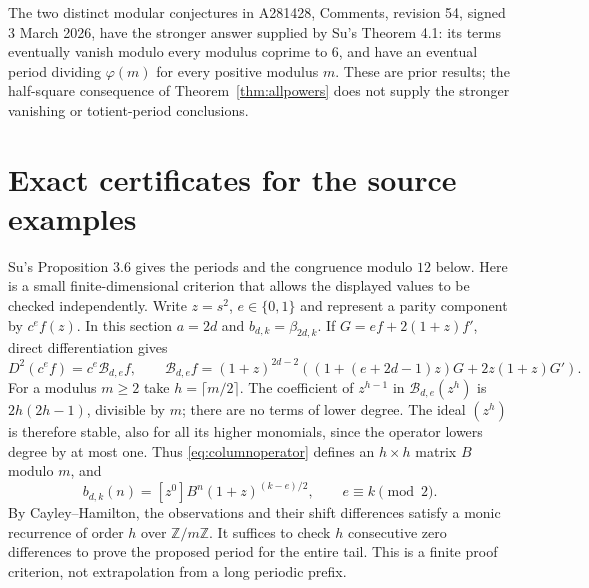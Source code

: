 \documentclass[11pt]{article}
\newcommand{\Z}{\mathbb Z}
\newcommand{\ph}{\varphi}
\begin{document}
The two distinct modular conjectures in A281428, Comments, revision 54,
signed 3 March 2026, have the stronger answer supplied by
Su's Theorem 4.1: its terms eventually vanish modulo every modulus
coprime to $6$, and have an eventual period dividing $\ph(m)$ for
every positive modulus $m$. These are prior results; the half-square
consequence of Theorem~\ref{thm:allpowers} does not supply the
stronger vanishing or totient-period conclusions.

\section{Exact certificates for the source examples}
Su's Proposition 3.6 gives the periods and the congruence modulo
$12$ below. Here is a small finite-dimensional criterion that
allows the displayed values to be checked independently.
Write $z=s^2$, $e\in\{0,1\}$ and represent a parity component by
$c^e f(z)$. In this section $a=2d$ and
$b_{d,k}=\beta_{2d,k}$. If $G=ef+2(1+z)f'$, direct differentiation gives
\begin{equation}\label{eq:columnoperator}
 D^2(c^ef)=c^e\mathcal B_{d,e}f,\qquad
 \mathcal B_{d,e}f=(1+z)^{2d-2}
 \left((1+(e+2d-1)z)G+2z(1+z)G'\right).
\end{equation}
For a modulus $m\ge2$ take $h=\lceil m/2\rceil$.
The coefficient of $z^{h-1}$ in $\mathcal B_{d,e}(z^h)$ is
$2h(2h-1)$, divisible by $m$; there are no terms of lower degree.
The ideal $(z^h)$ is therefore stable, also for all its higher
monomials, since the operator lowers degree by at most one.
Thus \eqref{eq:columnoperator} defines an $h\times h$ matrix $B$
modulo $m$, and
\[
 b_{d,k}(n)=[z^0]B^n(1+z)^{(k-e)/2},\qquad e\equiv k\pmod2.
\]
By Cayley--Hamilton, the observations and their shift differences
satisfy a monic recurrence of order $h$ over $\Z/m\Z$.
It suffices to check $h$ consecutive zero differences to prove
the proposed period for the entire tail. This is a finite proof
criterion, not extrapolation from a long periodic prefix.
\end{document}

